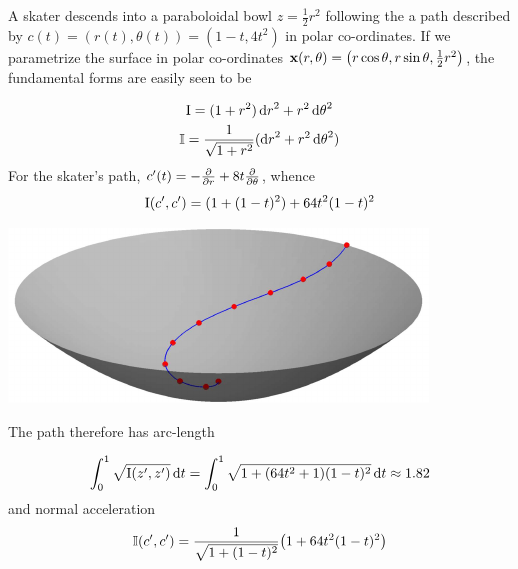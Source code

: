 \begin{example}{}{}
A skater descends into a paraboloidal bowl $z=\frac 12r^2$ following the a path described by $c(t)=(r(t),\theta(t))=(1-t,4t^2)$ in polar co-ordinates. If we parametrize the surface in polar co-ordinates ${\mathbf{x}}(r,\theta)=\bigl(r\cos\theta,r\sin\theta,\frac 12r^2\bigr)$, the fundamental forms are easily seen to be\par
	\begin{minipage}[t]{0.5\linewidth}\vspace{-10pt}
	\begin{gather*}
	\mathrm{I}=(1+r^2)\,{\mathrm{d} r}^2+r^2\,{\mathrm{d}\theta}^2\\
	\mathbb{I}=\frac 1{\sqrt{1+r^2}}({\mathrm{d} r}^2+r^2\,{\mathrm{d}\theta}^2)
	\end{gather*}
	For the skater's path, $c'(t)=-\frac{\partial }{\partial r}+8t\frac{\partial }{\partial \theta}$, whence
	\[\mathrm{I}(c',c')=(1+(1-t)^2)+64t^2(1-t)^2\]
	\end{minipage}\hfill\begin{minipage}[t]{0.49\linewidth}\vspace{0pt}
	\flushright\includegraphics{fund-skater}
	\end{minipage}\bigbreak
	The path therefore has arc-length\par
	\begin{minipage}[t]{0.6\linewidth}\vspace{-8pt}
	\[\int_0^1\sqrt{\mathrm{I}(z',z')}\,{\mathrm{d} t}=\int_0^1\sqrt{1+(64t^2+1)(1-t)^2}\,{\mathrm{d} t} \approx 1.82\]
		and normal acceleration
	\[\mathbb{I}(c',c')=\frac 1{\sqrt{1+(1-t)^2}}\bigl(1+64t^2(1-t)^2\bigr)\]
	\end{minipage}\hfill\begin{minipage}[t]{0.39\linewidth}\vspace{-2pt}

\end{minipage}
\end{example}
